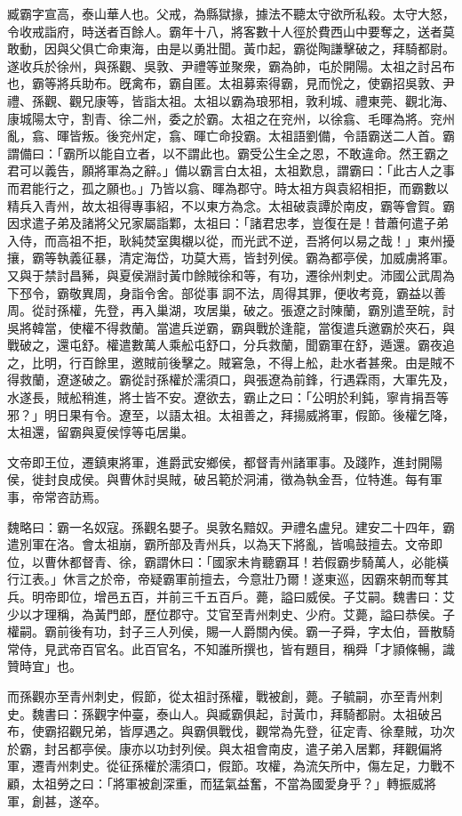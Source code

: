 
\begin{pinyinscope}
臧霸字宣高，泰山華人也。父戒，為縣獄掾，據法不聽太守欲所私殺。太守大怒，令收戒詣府，時送者百餘人。霸年十八，將客數十人徑於費西山中要奪之，送者莫敢動，因與父俱亡命東海，由是以勇壯聞。黃巾起，霸從陶謙擊破之，拜騎都尉。遂收兵於徐州，與孫觀、吳敦、尹禮等並聚衆，霸為帥，屯於開陽。太祖之討呂布也，霸等將兵助布。旣禽布，霸自匿。太祖募索得霸，見而恱之，使霸招吳敦、尹禮、孫觀、觀兄康等，皆詣太祖。太祖以霸為琅邪相，敦利城、禮東莞、觀北海、康城陽太守，割青、徐二州，委之於霸。太祖之在兖州，以徐翕、毛暉為將。兖州亂，翕、暉皆叛。後兖州定，翕、暉亡命投霸。太祖語劉備，令語霸送二人首。霸謂備曰：「霸所以能自立者，以不謂此也。霸受公生全之恩，不敢違命。然王霸之君可以義告，願將軍為之辭。」備以霸言白太祖，太祖歎息，謂霸曰：「此古人之事而君能行之，孤之願也。」乃皆以翕、暉為郡守。時太祖方與袁紹相拒，而霸數以精兵入青州，故太祖得專事紹，不以東方為念。太祖破袁譚於南皮，霸等會賀。霸因求遣子弟及諸將父兄家屬詣鄴，太祖曰：「諸君忠孝，豈復在是！昔蕭何遣子弟入侍，而高祖不拒，耿純焚室輿櫬以從，而光武不逆，吾將何以易之哉！」東州擾攘，霸等執義征暴，清定海岱，功莫大焉，皆封列侯。霸為都亭侯，加威虜將軍。又與于禁討昌豨，與夏侯淵討黃巾餘賊徐和等，有功，遷徐州刺史。沛國公武周為下邳令，霸敬異周，身詣令舍。部從事𧩪詷不法，周得其罪，便收考竟，霸益以善周。從討孫權，先登，再入巢湖，攻居巢，破之。張遼之討陳蘭，霸別遣至皖，討吳將韓當，使權不得救蘭。當遣兵逆霸，霸與戰於逢龍，當復遣兵邀霸於夾石，與戰破之，還屯舒。權遣數萬人乘舩屯舒口，分兵救蘭，聞霸軍在舒，遁還。霸夜追之，比明，行百餘里，邀賊前後擊之。賊窘急，不得上舩，赴水者甚衆。由是賊不得救蘭，遼遂破之。霸從討孫權於濡須口，與張遼為前鋒，行遇霖雨，大軍先及，水遂長，賊舩稍進，將士皆不安。遼欲去，霸止之曰：「公明於利鈍，寧肯捐吾等邪？」明日果有令。遼至，以語太祖。太祖善之，拜揚威將軍，假節。後權乞降，太祖還，留霸與夏侯惇等屯居巢。

文帝即王位，遷鎮東將軍，進爵武安鄉侯，都督青州諸軍事。及踐阼，進封開陽侯，徙封良成侯。與曹休討吳賊，破呂範於洞浦，徵為執金吾，位特進。每有軍事，帝常咨訪焉。

魏略曰：霸一名奴寇。孫觀名嬰子。吳敦名黯奴。尹禮名盧兒。建安二十四年，霸遣別軍在洛。會太祖崩，霸所部及青州兵，以為天下將亂，皆鳴鼓擅去。文帝即位，以曹休都督青、徐，霸謂休曰：「國家未肯聽霸耳！若假霸步騎萬人，必能橫行江表。」休言之於帝，帝疑霸軍前擅去，今意壯乃爾！遂東巡，因霸來朝而奪其兵。明帝即位，增邑五百，并前三千五百戶。薨，謚曰威侯。子艾嗣。魏書曰：艾少以才理稱，為黃門郎，歷位郡守。艾官至青州刺史、少府。艾薨，謚曰恭侯。子權嗣。霸前後有功，封子三人列侯，賜一人爵關內侯。霸一子舜，字太伯，晉散騎常侍，見武帝百官名。此百官名，不知誰所撰也，皆有題目，稱舜「才頴條暢，識贊時宜」也。

而孫觀亦至青州刺史，假節，從太祖討孫權，戰被創，薨。子毓嗣，亦至青州刺史。魏書曰：孫觀字仲臺，泰山人。與臧霸俱起，討黃巾，拜騎都尉。太祖破呂布，使霸招觀兄弟，皆厚遇之。與霸俱戰伐，觀常為先登，征定青、徐羣賊，功次於霸，封呂都亭侯。康亦以功封列侯。與太祖會南皮，遣子弟入居鄴，拜觀偏將軍，遷青州刺史。從征孫權於濡須口，假節。攻權，為流矢所中，傷左足，力戰不顧，太祖勞之曰：「將軍被創深重，而猛氣益奮，不當為國愛身乎？」轉振威將軍，創甚，遂卒。


\end{pinyinscope}